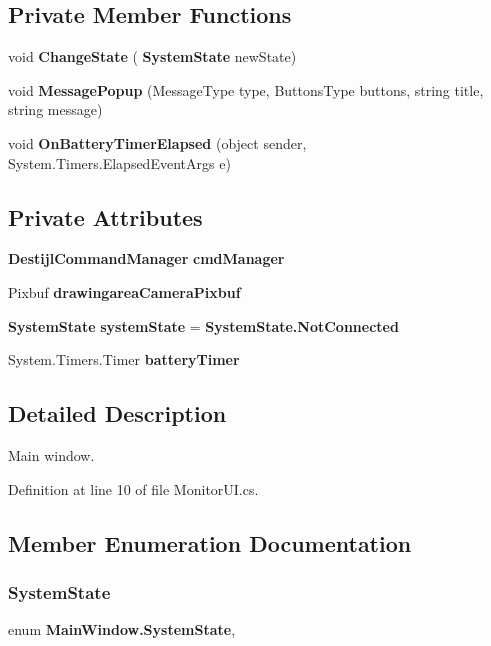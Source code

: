 \subsection*{Private Member Functions}
\begin{DoxyCompactItemize}
\item 
void \textbf{ Change\+State} (\textbf{ System\+State} new\+State)
\item 
void \textbf{ Message\+Popup} (Message\+Type type, Buttons\+Type buttons, string title, string message)
\item 
void \textbf{ On\+Battery\+Timer\+Elapsed} (object sender, System.\+Timers.\+Elapsed\+Event\+Args e)
\end{DoxyCompactItemize}
\subsection*{Private Attributes}
\begin{DoxyCompactItemize}
\item 
\textbf{ Destijl\+Command\+Manager} \textbf{ cmd\+Manager}
\item 
Pixbuf \textbf{ drawingarea\+Camera\+Pixbuf}
\item 
\textbf{ System\+State} \textbf{ system\+State} = \textbf{ System\+State.\+Not\+Connected}
\item 
System.\+Timers.\+Timer \textbf{ battery\+Timer}
\end{DoxyCompactItemize}


\subsection{Detailed Description}
Main window. 



Definition at line 10 of file Monitor\+U\+I.\+cs.



\subsection{Member Enumeration Documentation}
\mbox{\label{class_main_window_a7b18ca1f8f71faf272c9856aaf7b8e3d}} 
\subsubsection{System\+State}
{\footnotesize\ttfamily enum \textbf{ Main\+Window.\+System\+State}\hspace{0.3cm}{\ttfamily [strong]}, {\ttfamily [private]}}

